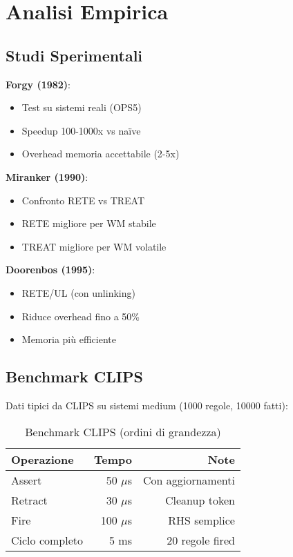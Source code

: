 \section{Analisi Empirica}

\subsection{Studi Sperimentali}

\textbf{Forgy (1982)}:
\begin{itemize}
\item Test su sistemi reali (OPS5)
\item Speedup 100-1000x vs naïve
\item Overhead memoria accettabile (2-5x)
\end{itemize}

\textbf{Miranker (1990)}:
\begin{itemize}
\item Confronto RETE vs TREAT
\item RETE migliore per WM stabile
\item TREAT migliore per WM volatile
\end{itemize}

\textbf{Doorenbos (1995)}:
\begin{itemize}
\item RETE/UL (con unlinking)
\item Riduce overhead fino a 50\%
\item Memoria più efficiente
\end{itemize}

\subsection{Benchmark CLIPS}

Dati tipici da CLIPS su sistemi medium (1000 regole, 10000 fatti):

\begin{table}[h]
\centering
\begin{tabular}{@{}lrr@{}}
\toprule
\textbf{Operazione} & \textbf{Tempo} & \textbf{Note} \\
\midrule
Assert & 50 $\mu$s & Con aggiornamenti \\
Retract & 30 $\mu$s & Cleanup token \\
Fire & 100 $\mu$s & RHS semplice \\
Ciclo completo & 5 ms & 20 regole fired \\
\bottomrule
\end{tabular}
\caption{Benchmark CLIPS (ordini di grandezza)}
\end{table}

